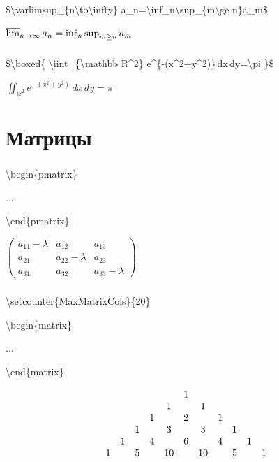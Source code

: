 \documentclass[russian, 14pt]{beamer}
\newcommand{\cm}[1]{{\color{Mycolor3}\textbackslash#1}}
\begin{document}
\begin{frame}
	\frametitle{\insertsection}
	\begin{block}{}
		\$\cm{varlimsup}\_\{n\cm{to}\cm{infty}\}
		a\_n=\cm{inf}\_n\cm{sup}\_\{m\cm{ge} n\}a\_m\$
	\end{block}
		\LARGE$\varlimsup_{n\to\infty}
a_n=\inf_n\sup_{m\ge n}a_m$
\end{frame}

\begin{frame}
	\frametitle{\insertsection}
	\begin{block}{}
		\$\cm{boxed}\{
			\cm{iint}\_\{\cm{mathbb} R\string^2\}
			e\string^\{-(x\string^2+y\string^2)\}\,dx\,dy=\cm{pi}
		\}\$
	\end{block}
	\LARGE$\boxed{
		\iint_{\mathbb R^2}
		e^{-(x^2+y^2)}\,dx\,dy=\pi
	}$
\end{frame}

\section{Матрицы}

\begin{frame}
	\frametitle{\insertsection}
	\begin{block}{}
		\cm{begin}\{pmatrix\}
		
		
		...
		
		
		\cm{end}\{pmatrix\}
	\end{block}
	\LARGE$\begin{pmatrix}
		a_{11}-\lambda & a_{12}&a_{13}\\
		a_{21}& a_{22}-\lambda &a_{23}\\
		a_{31}& a_{32}&a_{33}-\lambda
	\end{pmatrix}$
\end{frame}

\begin{frame}
	\frametitle{\insertsection}
	\begin{block}{}
		\cm{setcounter}\{MaxMatrixCols\}\{20\}
		
		
		\cm{begin}\{matrix\}
		
		
		...
		
		
		\cm{end}\{matrix\}
	\end{block}
	\[
	\setcounter{MaxMatrixCols}{20}
	\begin{matrix}
		&&&&&& 1\\
		&&&&& 1 && 1\\
		&&&& 1 && 2 && 1\\
		&&& 1 && 3 && 3 && 1\\
		&& 1 && 4 && 6 && 4 && 1\\
		&1 && 5 && 10 && 10 && 5 && 1
	\end{matrix}
	\]
\end{frame}
\end{document}
